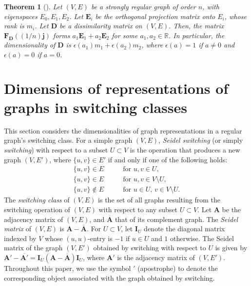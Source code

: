 \documentclass[a4paper, 11pt]{article}
\newcommand{\A}{\boldsymbol{A}}
\newcommand{\E}{\boldsymbol{E}}
\newcommand{\I}{\boldsymbol{I}}
\newcommand{\D}{\boldsymbol{D}}
\newcommand{\F}{\boldsymbol{F}}
\newcommand{\jv}{\boldsymbol{j}}
\newtheorem{theorem}{Theorem}[section]
\theoremstyle{definition}
\begin{document}
\begin{theorem}[{\cite[Theorem 3.3 and Remark 3.4]{NSSpre}}] \label{thm:dimrep}
Let $(V,E)$ be a strongly regular graph of order $n$, with eigenspaces $E_0, E_1, E_2$. 
Let $\E_i$ be the orthogonal projection matrix onto $E_i$, whose rank is $m_i$. Let $\D$ be a dissimilarity matrix on $(V,E)$.  
Then, the matrix $\F_{\D}((1/n)\jv)$ forms $a_1 \E_1+a_2 \E_2$ for some $a_1,a_2 \in \mathbb{R}$. In particular, the dimensionality of $\D$ is $\epsilon(a_1) m_1 +\epsilon (a_2) m_2$, where $\epsilon(a)=1$ if $a\ne 0$ and $\epsilon(a)=0$ if $a= 0$. 
\end{theorem}




\section{Dimensions of representations of graphs in switching classes} \label{sec:3}
This section considers the dimensionalities of graph representations in a regular graph's switching class.   
For a simple graph $(V, E)$, {\it Seidel switching} (or simply {\it switching}) with respect to a subset $U \subset V$ is the operation that produces a new graph $(V, E')$, where $\{u, v\} \in E'$ if and only if one of the following holds:
\begin{align*}
\{u, v\} \in E & \qquad \text{for } u, v \in U, \\
\{u, v\} \in E & \qquad \text{for } u, v \in V \setminus U, \\
\{u, v\} \notin E & \qquad \text{for } u \in U,\, v \in V \setminus U.
\end{align*}
The {\it switching class} of  $(V,E)$ is the set of all graphs resulting from the switching operation of $(V,E)$ with respect to any subset $U\subset V$. Let $\A$ be the adjacency matrix of $(V,E)$, and $\overline{\A}$ that of its complement graph. 
The {\it Seidel matrix} of $(V,E)$ is $\A-\overline{\A}$. 
For $U\subset V$, let $\I_U$ denote the diagonal matrix indexed by $V$ whose $(u,u)$-entry is $-1$ if $u \in U$ and $1$ otherwise. 
The Seidel matrix of the graph $(V, E')$ obtained by switching with respect to $U$ is given by $\A' - \overline{\A'} = \I_U (\A - \overline{\A}) \I_U$,  
where $\A'$ is the adjacency matrix of $(V, E')$.  
Throughout this paper, we use the symbol $'$ (apostrophe) to denote the corresponding object associated with the graph obtained by switching.
\end{document}
